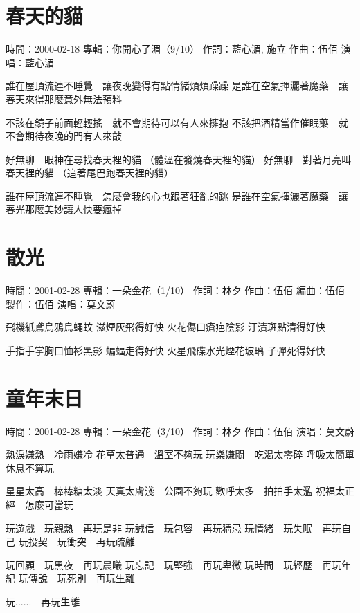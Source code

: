 \documentclass[UTF8,a4paper,oneside,twocolumn,12pt]{ctexbook}
\newcommand{\infopair}[2]{\textbullet #1：#2}
\newcommand{\zc}[1][伍佰]{\infopair{作詞}{#1}}
\newcommand{\zq}[1][伍佰]{\infopair{作曲}{#1}}
\newcommand{\bq}[1][伍佰]{\infopair{編曲}{#1}}
\newcommand{\zj}[1]{\infopair{專輯}{#1}}
\newcommand{\zz}[1]{\infopair{製作}{#1}}
\newcommand{\sj}[1]{\infopair{時間}{#1}}
\newenvironment{info}{\begin{flushleft}\kaishu
	}
	{\end{flushleft}\normalsize\yahei\par}
\newenvironment{lyric}{
	}
{}
\begin{document}
\section{春天的貓}
\begin{info}
	\sj{2000-02-18}
	\zj{你開心了湄（9/10）}
	\zc[藍心湄, 施立]
	\zq
	\infopair{演唱}{藍心湄}
\end{info}
\begin{lyric}
	誰在屋頂流連不睡覺　讓夜晚變得有點情緒煩煩躁躁
	是誰在空氣揮灑著魔藥　讓春天來得那麼意外無法預料

	不該在鏡子前面輕輕搖　就不會期待可以有人來擁抱
	不該把酒精當作催眠藥　就不會期待夜晚的門有人來敲

	好無聊　眼神在尋找春天裡的貓 （體溫在發燒春天裡的貓）
	好無聊　對著月亮叫春天裡的貓 （追著尾巴跑春天裡的貓）

	誰在屋頂流連不睡覺　怎麼會我的心也跟著狂亂的跳
	是誰在空氣揮灑著魔藥　讓春光那麼美妙讓人快要瘋掉
\end{lyric}

\section{散光}
\begin{info}
	\sj{2001-02-28}
	\zj{一朵金花（1/10）}
	\zc[林夕]
	\zq
	\bq[伍佰]
	\zz{伍佰}
	\infopair{演唱}{莫文蔚}
\end{info}
\begin{lyric}
	飛機紙鳶烏鴉烏蠅蚊 滋煙灰飛得好快
	火花傷口瘡疤陰影 汙漬斑點清得好快

	手指手掌胸口恤衫黑影 蝙蝠走得好快
	火星飛碟水光煙花玻璃 子彈死得好快
\end{lyric}

\section{童年末日}
\begin{info}
	\sj{2001-02-28}
	\zj{一朵金花（3/10）}
	\zc[林夕]
	\zq
	\infopair{演唱}{莫文蔚}
\end{info}
\begin{lyric}
	熱淚嫌熱　冷雨嫌冷
	花草太普通　溫室不夠玩
	玩樂嫌悶　吃渴太零碎
	呼吸太簡單　休息不算玩

	星星太高　棒棒糖太淡
	天真太膚淺　公園不夠玩
	歡呼太多　拍拍手太濫
	祝福太正經　怎麼可當玩

	玩遊戲　玩親熱　再玩是非
	玩誠信　玩包容　再玩猜忌
	玩情緒　玩失眠　再玩自己
	玩投契　玩衝突　再玩疏離

	玩回顧　玩黑夜　再玩晨曦
	玩忘記　玩堅強　再玩卑微
	玩時間　玩經歷　再玩年紀
	玩傳說　玩死別　再玩生離

	玩......　再玩生離
\end{lyric}
\end{document}
